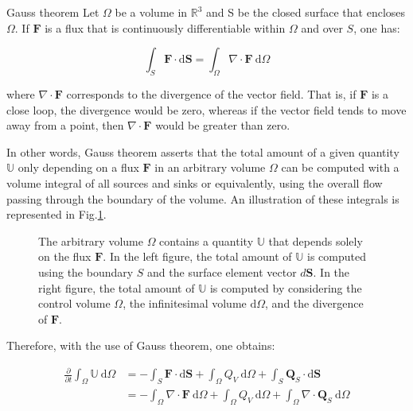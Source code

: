 \vspace{5mm}
\begin{box_definition}{Gauss theorem}
Let $\Omega$ be a volume in $\mathbb{R}^3$ and S be the closed surface that encloses $\Omega$. If $\mathbf{F} $ is a flux that is continuously differentiable within $\Omega$ and over $S$,  one has:

\begin{equation}
\int_S \mathbf{F} \cdot \mathrm{d} \mathbf{S}=\int_{\Omega} \nabla \cdot \mathbf{F} \ \mathrm{d}\Omega
\label{C2 - EQ - Gauss theorem}
\end{equation}
\vspace{-0.2em}

where $\nabla \cdot \mathbf{F}$ corresponds to the divergence of the vector field. That is, if $\mathbf{F}$ is a close loop, the divergence would be zero, whereas if the vector field tends to move away from a point, then $\nabla \cdot \mathbf{F}$ would be greater than zero.

\end{box_definition}
\vspace{3mm}

In other words, Gauss theorem asserts that the total amount of a given quantity  $\mathbb{U}$ only depending on a flux $\mathbf{F}$ in an arbitrary volume $\Omega$ can be computed with a volume integral of all sources and sinks or equivalently, using the overall flow passing through the boundary of the volume. An illustration of these integrals is represented in Fig.\ref{C2 - FIG - Gauss}.

\vspace{0.4em}
\begin{figure}[!h]
    \centering
        
    \caption{The arbitrary volume $\Omega$ contains a quantity $\mathbb{U}$ that depends solely on the flux $\mathbf{F}$. In the left figure, the total amount of $\mathbb{U}$ is computed using the boundary $S$ and the surface element vector $d\mathbf{S}$. In the right figure, the total amount of $\mathbb{U}$ is computed by considering the control volume $\Omega$, the infinitesimal volume $\mathrm{d}\Omega$, and the divergence of $\mathbf{F}$.}
    \label{C2 - FIG - Gauss}
\end{figure}

\newpage

Therefore, with the use of Gauss theorem, one obtains:

\vspace{-0.8em}
\begin{spreadlines}{1em}
\begin{align*}
\frac{\partial}{\partial t} \int_{\Omega} \mathbb{U} \mathrm{~d} \Omega & = - \int_S \mathbf{F} \cdot \mathrm{d} \mathbf{S} + \int_{\Omega} Q_V \mathrm{~d} \Omega + \int_S \mathbf{Q}_S \cdot \mathrm{d} \mathbf{S} \\
& = - \int_{\Omega} \nabla \cdot \mathbf{F} \mathrm{~d} \Omega + \int_{\Omega} Q_V \mathrm{~d} \Omega + \int_{\Omega} \nabla \cdot \mathbf{Q}_S \mathrm{~d} \Omega
\end{align*}
\end{spreadlines}
\vspace{-0.6em}

